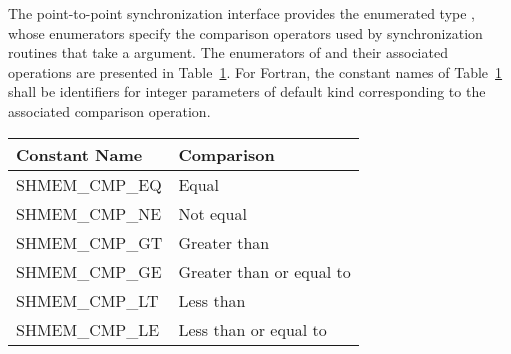 The point-to-point synchronization interface provides the enumerated type
, whose enumerators specify the comparison operators used
by synchronization routines that take a  argument. The
enumerators of  and their associated operations are
presented in Table~\ref{p2p-consts}.  For Fortran, the constant names of
Table~\ref{p2p-consts} shall be identifiers for integer parameters of
default kind corresponding to the associated comparison operation.

\begin{table}[h]
  \begin{center}
    \begin{tabular}{ll}
      \hline
      Constant Name    & Comparison               \\ \hline
      SHMEM\_CMP\_EQ   & Equal                    \\
      SHMEM\_CMP\_NE   & Not equal                \\
      SHMEM\_CMP\_GT   & Greater than             \\
      SHMEM\_CMP\_GE   & Greater than or equal to \\
      SHMEM\_CMP\_LT   & Less than                \\
      SHMEM\_CMP\_LE   & Less than or equal to    \\ \hline
    \end{tabular}
    \label{p2p-consts}
  \end{center}
\end{table}
